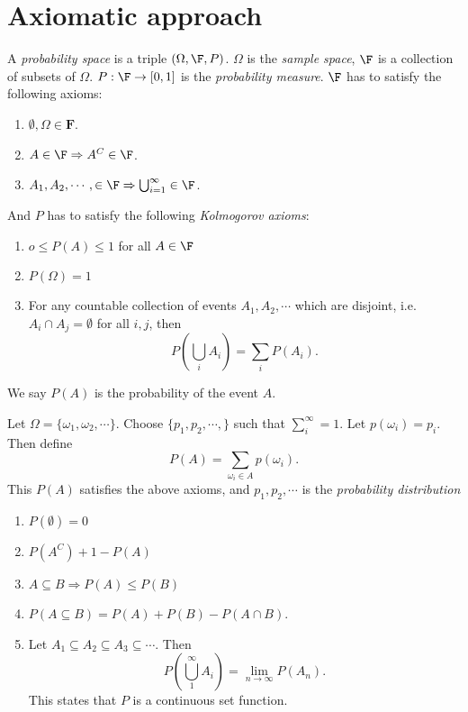 \documentclass[a4paper]{article}
\begin{document}
\section{Axiomatic approach}
\begin{defi}
  A \emph{probability space} is a triple $(\Omega, \F, P)$. $\Omega$ is the \emph{sample space}, $\F$ is a collection of subsets of $\Omega$. $P: \F\to [0, 1]$ is the \emph{probability measure}. $\F$ has to satisfy the following axioms:
  \begin{enumerate}
    \item $\emptyset, \Omega\in \mathbf{F}$.
    \item $A\in \F \Rightarrow  A^C\in \F$.
    \item $A_1, A_2, \cdots, \in \F \Rightarrow \bigcup_{i = 1}^\infty \in \F$.
  \end{enumerate}
  And $P$ has to satisfy the following \emph{Kolmogorov axioms}:
  \begin{enumerate}
    \item $o \leq P(A) \leq 1 $ for all $A\in \F$
    \item $P(\Omega) = 1$
    \item For any countable collection of events $A_1, A_2, \cdots$ which are disjoint, i.e. $A_i\cap A_j = \emptyset$ for all $i, j$, then
      \[
        P\left(\bigcup_i A_i\right) = \sum_i P(A_i).
      \]
  \end{enumerate}
  We say $P(A)$ is the probability of the event $A$.
\end{defi}

\begin{defi}
  Let $\Omega = \{\omega_1, \omega_2, \cdots\}$. Choose $\{p_1, p_2, \cdots, \}$ such that $\sum_{i}^\infty = 1$. Let $p(\omega_i) = p_i$. Then define
  \[
    P(A) = \sum_{\omega_i\in A} p(\omega_i).
  \]
  This $P(A)$ satisfies the above axioms, and $p_1, p_2, \cdots$ is the \emph{probability distribution}
\end{defi}

\begin{thm}\leavevmode
  \begin{enumerate}
    \item $P(\emptyset) = 0$
    \item $P(A^C) + 1 - P(A)$
    \item $A\subseteq B \Rightarrow P(A) \leq P(B)$
    \item $P (A\subseteq B) = P(A) + P(B) - P(A\cap B)$.
    \item Let $A_1\subseteq A_2\subseteq A_3\subseteq \cdots$. Then
      \[
        P\left(\bigcup_1^\infty A_i\right) = \lim_{n\to \infty} P(A_n).
      \]
      This states that $P$ is a continuous set function.
  \end{enumerate}
\end{thm}
\end{document}
